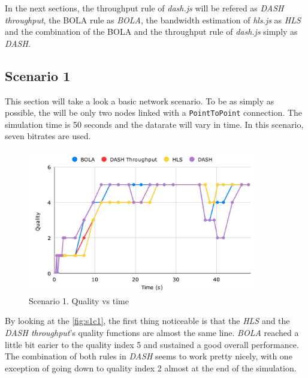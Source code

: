 In the next sections, the throughput rule of \textit{dash.js} will be refered as \textit{DASH throughput},
the BOLA rule as \textit{BOLA}, the bandwidth estimation of \textit{hls.js} as \textit{HLS} and the combination
of the BOLA and the throughput rule of \textit{dash.js} simply as \textit{DASH}.

\subsection{Scenario 1}
This section will take a look a basic network scenario. To be as simply as possible, the will be 
only two nodes linked with a \texttt{PointToPoint} connection. The simulation time is 50 seconds 
and the datarate will vary in time. In this scenario, seven bitrates are used.

\begin{figure}[h]
    \centering
    \includegraphics[width=0.9\textwidth]{img/s1c1.pdf}
    \caption{Scenario 1. Quality vs time}
    \label{fig:s1c1}
\end{figure}

By looking at the \autoref{fig:s1c1}, the first thing noticeable is that the \textit{HLS} and the \textit{DASH throughput}'s
quality functions are almost the same line. \textit{BOLA} reached a little bit earier to the quality index 5 and 
sustained a good overall performance.
The combination of both rules in \textit{DASH} seems to work pretty nicely, with one exception of going
down to quality index 2 almost at the end of the simulation. 

